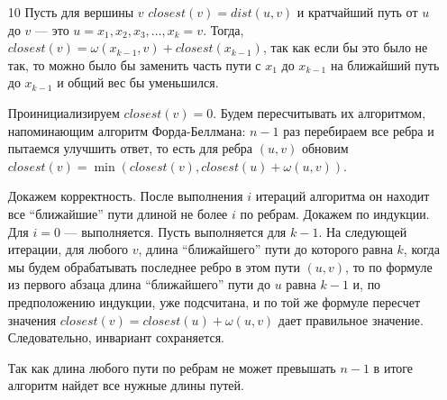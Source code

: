 \documentclass[10pt]{article}
\begin{document}
\title{}
\author{Антон Афанасьев}
\maketitle

\begin{enumerate}
\item[10] Пусть для вершины $v$ $closest(v) = dist(u, v)$ и кратчайший путь от $u$ до $v$ --- это $u=x_1, x_2, x_3, \ldots, x_k=v$. Тогда, $closest(v) = \omega(x_{k-1}, v) + closest(x_{k-1})$, так как если бы это было не так, то можно было бы заменить часть пути с $x_1$ до $x_{k-1}$ на ближайший путь до $x_{k-1}$ и общий вес бы уменьшился.
  
Проинициализируем $closest(v) = 0$. Будем пересчитывать их алгоритмом, напоминающим алгоритм Форда-Беллмана: $n-1$ раз перебираем все ребра и пытаемся улучшить ответ, то есть для ребра $(u, v)$ обновим $closest(v) = \min(closest(v), closest(u)+\omega(u, v))$.

Докажем корректность. После выполнения $i$ итераций алгоритма он находит все ``ближайшие'' пути длиной не более $i$ по ребрам. Докажем по индукции. Для $i=0$ --- выполняется. Пусть выполняется для $k-1$. На следующей итерации, для любого $v$, длина ``ближайшего'' пути до которого равна $k$, когда мы будем обрабатывать последнее ребро в этом пути $(u, v)$, то по формуле из первого абзаца длина ``ближайшего'' пути до $u$ равна $k-1$ и, по предположению индукции, уже подсчитана, и по той же формуле пересчет значения $closest(v) = closest(u)+\omega(u, v)$ дает правильное значение. Следовательно, инвариант сохраняется.

Так как длина любого пути по ребрам не может превышать $n-1$ в итоге алгоритм найдет все нужные длины путей.

\end{enumerate}
\end{document}
